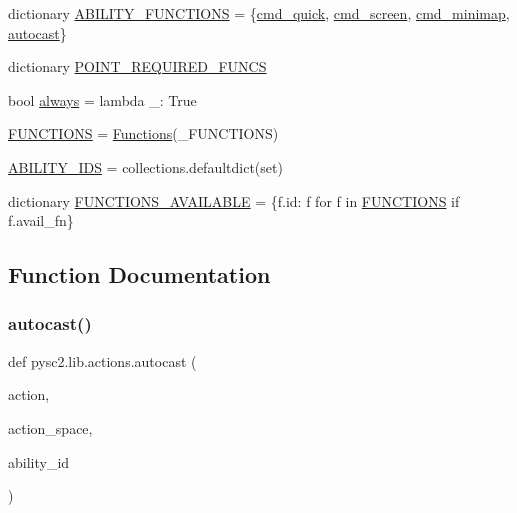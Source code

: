 \begin{DoxyCompactItemize}
\item 
dictionary \mbox{\hyperlink{namespacepysc2_1_1lib_1_1actions_a9760f56ed18b819f0c6a6c4e57bd83d6}{A\+B\+I\+L\+I\+T\+Y\+\_\+\+F\+U\+N\+C\+T\+I\+O\+NS}} = \{\mbox{\hyperlink{namespacepysc2_1_1lib_1_1actions_a2129f1b3173891d9a1d311d1dda40d78}{cmd\+\_\+quick}}, \mbox{\hyperlink{namespacepysc2_1_1lib_1_1actions_a6a71ca9bf1a3ce76be66fe022c827d4a}{cmd\+\_\+screen}}, \mbox{\hyperlink{namespacepysc2_1_1lib_1_1actions_a60765a989aa093570dfcb690d81dd2d6}{cmd\+\_\+minimap}}, \mbox{\hyperlink{namespacepysc2_1_1lib_1_1actions_a30a09b1c2a0e2eb0799bb453dcc00842}{autocast}}\}
\item 
dictionary \mbox{\hyperlink{namespacepysc2_1_1lib_1_1actions_a22bc36b3d88484b563cac8349be53c67}{P\+O\+I\+N\+T\+\_\+\+R\+E\+Q\+U\+I\+R\+E\+D\+\_\+\+F\+U\+N\+CS}}
\item 
bool \mbox{\hyperlink{namespacepysc2_1_1lib_1_1actions_ae1dc5f547908d78c7367d3c734b29a59}{always}} = lambda \+\_\+\+: True
\item 
\mbox{\hyperlink{namespacepysc2_1_1lib_1_1actions_abbcb29aed5164d4b08a733a4415b98ce}{F\+U\+N\+C\+T\+I\+O\+NS}} = \mbox{\hyperlink{classpysc2_1_1lib_1_1actions_1_1_functions}{Functions}}(\+\_\+\+F\+U\+N\+C\+T\+I\+O\+NS)
\item 
\mbox{\hyperlink{namespacepysc2_1_1lib_1_1actions_a1a530662a2ee381a88e0f1f3f0667d53}{A\+B\+I\+L\+I\+T\+Y\+\_\+\+I\+DS}} = collections.\+defaultdict(set)
\item 
dictionary \mbox{\hyperlink{namespacepysc2_1_1lib_1_1actions_a765ca06e5401167678bcf5766d3556bf}{F\+U\+N\+C\+T\+I\+O\+N\+S\+\_\+\+A\+V\+A\+I\+L\+A\+B\+LE}} = \{f.\+id\+: f for f in \mbox{\hyperlink{namespacepysc2_1_1lib_1_1actions_abbcb29aed5164d4b08a733a4415b98ce}{F\+U\+N\+C\+T\+I\+O\+NS}} if f.\+avail\+\_\+fn\}
\end{DoxyCompactItemize}


\subsection{Function Documentation}
\mbox{\label{namespacepysc2_1_1lib_1_1actions_a30a09b1c2a0e2eb0799bb453dcc00842}} 
\subsubsection{\texorpdfstring{autocast()}{autocast()}}
{\footnotesize\ttfamily def pysc2.\+lib.\+actions.\+autocast (\begin{DoxyParamCaption}\item[{}]{action,  }\item[{}]{action\+\_\+space,  }\item[{}]{ability\+\_\+id }\end{DoxyParamCaption})}

